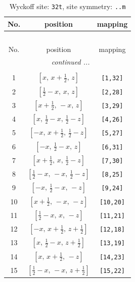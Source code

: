 \documentclass[fleqn,8pt]{jsarticle}
\begin{document}
\begin{longtable}{ccc}
\caption{Wyckoff site: {\tt 32t}, site symmetry: {\tt ..m}}
 \\
 \hline \hline
No. & position & mapping \\ \hline \endfirsthead

\multicolumn{2}{l}{\tablename\ \thetable{}} \\
 \hline \hline
No. & position & mapping \\ \hline \endhead

 \hline \hline
\multicolumn{2}{r}{\footnotesize\it continued ...} \\ \endfoot

 \hline \hline
\multicolumn{2}{r}{} \\ \endlastfoot

1 & $\left[ x,\, x + \frac{1}{2},\, z \right]$ & {\tt [1,32]} \\ \hline
2 & $\left[ \frac{1}{2} - x,\, x,\, z \right]$ & {\tt [2,28]} \\ \hline
3 & $\left[ x + \frac{1}{2},\, - x,\, z \right]$ & {\tt [3,29]} \\ \hline
4 & $\left[ x,\, \frac{1}{2} - x,\, \frac{1}{2} - z \right]$ & {\tt [4,26]} \\ \hline
5 & $\left[ - x,\, x + \frac{1}{2},\, \frac{1}{2} - z \right]$ & {\tt [5,27]} \\ \hline
6 & $\left[ - x,\, \frac{1}{2} - x,\, z \right]$ & {\tt [6,31]} \\ \hline
7 & $\left[ x + \frac{1}{2},\, x,\, \frac{1}{2} - z \right]$ & {\tt [7,30]} \\ \hline
8 & $\left[ \frac{1}{2} - x,\, - x,\, \frac{1}{2} - z \right]$ & {\tt [8,25]} \\ \hline
9 & $\left[ - x,\, \frac{1}{2} - x,\, - z \right]$ & {\tt [9,24]} \\ \hline
10 & $\left[ x + \frac{1}{2},\, - x,\, - z \right]$ & {\tt [10,20]} \\ \hline
11 & $\left[ \frac{1}{2} - x,\, x,\, - z \right]$ & {\tt [11,21]} \\ \hline
12 & $\left[ - x,\, x + \frac{1}{2},\, z + \frac{1}{2} \right]$ & {\tt [12,18]} \\ \hline
13 & $\left[ x,\, \frac{1}{2} - x,\, z + \frac{1}{2} \right]$ & {\tt [13,19]} \\ \hline
14 & $\left[ x,\, x + \frac{1}{2},\, - z \right]$ & {\tt [14,23]} \\ \hline
15 & $\left[ \frac{1}{2} - x,\, - x,\, z + \frac{1}{2} \right]$ & {\tt [15,22]} \\ \hline

\end{longtable}
\end{document}
